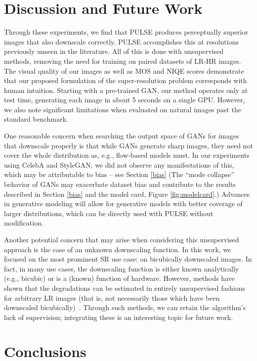\documentclass[10pt,twocolumn,letterpaper]{article}
\begin{document}
\section{Discussion and Future Work}
Through these experiments, we find that PULSE produces perceptually superior images that also downscale correctly. PULSE accomplishes this at resolutions previously unseen in the literature. All of this is done with unsupervised methods, removing the need for training on paired datasets of LR-HR images. The visual quality of our images as well as MOS and NIQE scores demonstrate that our proposed formulation of the super-resolution problem corresponds with human intuition. Starting with a pre-trained GAN, our method operates only at test time, generating each image in about 5 seconds on a single GPU. However, we also note significant limitations when evaluated on natural images past the standard benchmark.

One reasonable concern when searching the output space of GANs for images that downscale properly is that while GANs generate sharp images, they need not cover the whole distribution as, e.g., flow-based models must. In our experiments using CelebA and StyleGAN, we did not observe any manifestations of this, which may be attributable to bias – see Section \ref{bias} (The ``mode collapse'' behavior of GANs may exacerbate dataset bias and contribute to the results described in Section \ref{bias} and the model card, Figure \ref{fig:modelcard}.) Advances in generative modeling will allow for generative models with better coverage of larger distributions, which can be directly used with PULSE without modification.

Another potential concern that may arise when considering this unsupervised approach is the case of an unknown downscaling function. In this work, we focused on the most prominent SR use case: on bicubically downscaled images. In fact, in many use cases, the downscaling function is either known analytically (e.g., bicubic) or is a (known) function of hardware. However, methods have shown that the degradations can be estimated in entirely unsupervised fashions for arbitrary LR images (that is, not necessarily those which have been downscaled bicubically)~\cite{bulat2018learn,zhao2018unsupervised}. Through such methods, we can retain the algorithm's lack of supervision; integrating these is an interesting topic for future work.

\section{Conclusions}
\end{document}
